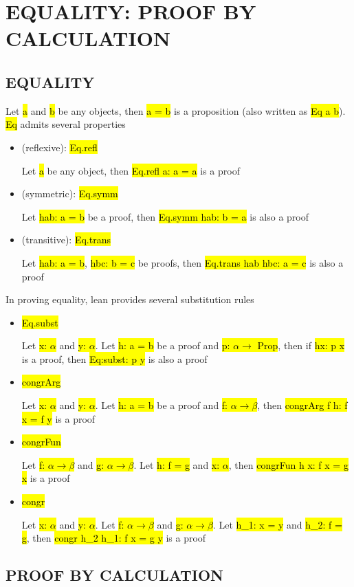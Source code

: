 \chapter{EQUALITY: PROOF BY CALCULATION}


\section{EQUALITY}


Let \hl{a} and \hl{b} be any objects, then \hl{a = b} is a proposition (also written as \hl{Eq a b}). \hl{Eq} admits several properties

\begin{itemize}
	\item (reflexive): \hl{Eq.refl}
	
	Let \hl{a} be any object, then \hl{Eq.refl a: a = a} is a proof
	
	\item (symmetric): \hl{Eq.symm}
	
	Let \hl{hab: a = b} be a proof, then \hl{Eq.symm hab: b = a} is also a proof
	
	\item (transitive): \hl{Eq.trans}
	
	Let \hl{hab: a = b}, \hl{hbc: b = c} be proofs, then \hl{Eq.trans hab hbc: a = c} is also a proof
\end{itemize}

In proving equality, lean provides several substitution rules

\begin{itemize}
	\item \hl{Eq.subst}
	
	Let \hl{x: $\alpha$} and \hl{y: $\alpha$}. Let \hl{h: a = b} be a proof and \hl{p: $\alpha \to$ Prop}, then if \hl{hx: p x} is a proof, then \hl{Eq:subst: p y} is also a proof
	
	\item \hl{congrArg}
	
	Let \hl{x: $\alpha$} and \hl{y: $\alpha$}. Let \hl{h: a = b} be a proof and \hl{f: $\alpha \to \beta$}, then \hl{congrArg f h: f x = f y} is a proof
	
	\item \hl{congrFun}
	
	Let \hl{f: $\alpha \to \beta$} and \hl{g: $\alpha \to \beta$}. Let \hl{h: f = g} and \hl{x: $\alpha$}, then \hl{congrFun h x: f x = g x} is a proof
	
	\item \hl{congr}
	
	Let \hl{x: $\alpha$} and \hl{y: $\alpha$}. Let \hl{f: $\alpha \to \beta$} and \hl{g: $\alpha \to \beta$}. Let \hl{h\_1: x = y} and \hl{h\_2: f = g}, then \hl{congr h\_2 h\_1: f x = g y} is a proof
\end{itemize}

\section{PROOF BY CALCULATION}


